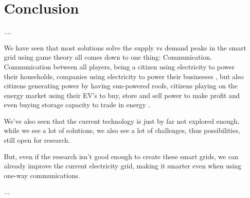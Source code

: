 \section{Conclusion}

....

We have seen that most solutions solve the supply vs demand peaks in the smart grid using game theory all comes down to one thing: Communication. Communication between all players, being a citizen using electricity to power their households, companies using electricity to power their businesses , but also citizens generating power by having sun-powered roofs, citizens playing on the energy market using their EV's to buy, store and sell power to make profit and even buying storage capacity to trade in energy .

We've also seen that the current technology is just by far not explored enough, while we see a lot of solutions, we also see a lot of challenges, thus possibilities, still open for research. 

But, even if the research  isn't good enough to create these smart grids, we can already improve the current electricity grid, making it smarter even when using one-way communications. \cite{AgarwalCui2012}

...